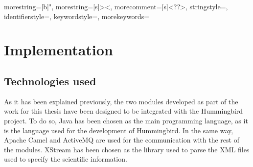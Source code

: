 


{
  morestring=[b]",
  morestring=[s]{>}{<},
  morecomment=[s]{<?}{?>},
  stringstyle=\color{black},
  identifierstyle=\color{darkblue},
  keywordstyle=\color{cyan},
  morekeywords={}%
}



\lstset{breaklines=true, breakatwhitespace=true}
\lstset{numbers=left, numberstyle=\scriptsize}
 


\chapter{Implementation}

\section{Technologies used}

As it has been explained previously, the two modules developed as part of the work for this thesis have been designed to be integrated with the Hummingbird project. To do so, Java\cite{Java} has been chosen as the main programming language, as it is the language used for the development of Hummingbird. In the same way, Apache Camel\cite{Camel} and ActiveMQ \cite{AMQ} are used for the communication with the rest of the modules. XStream\cite{XStream} has been chosen as the library used to parse the XML\cite{XML} files used to specify the scientific information.

